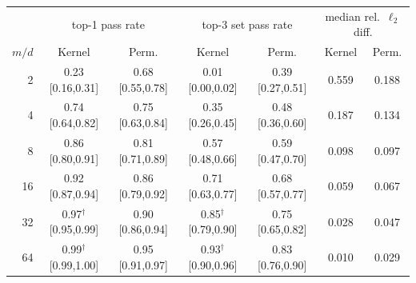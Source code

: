 \begin{tabular}{r|cc|cc|cc}
\toprule
& \multicolumn{2}{c|}{top-1 pass rate} & \multicolumn{2}{c|}{top-3 set pass rate} & \multicolumn{2}{c}{median rel.\ $\ell_2$ diff.}\\
$m/d$ & Kernel & Perm. & Kernel & Perm. & Kernel & Perm.\\
\midrule
2 & 0.23 [0.16,0.31] & 0.68 [0.55,0.78] & 0.01 [0.00,0.02] & 0.39 [0.27,0.51] & 0.559 & 0.188\\
4 & 0.74 [0.64,0.82] & 0.75 [0.63,0.84] & 0.35 [0.26,0.45] & 0.48 [0.36,0.60] & 0.187 & 0.134\\
8 & 0.86 [0.80,0.91] & 0.81 [0.71,0.89] & 0.57 [0.48,0.66] & 0.59 [0.47,0.70] & 0.098 & 0.097\\
16 & 0.92 [0.87,0.94] & 0.86 [0.79,0.92] & 0.71 [0.63,0.77] & 0.68 [0.57,0.77] & 0.059 & 0.067\\
32 & 0.97$^\dagger$ [0.95,0.99] & 0.90 [0.86,0.94] & 0.85$^\dagger$ [0.79,0.90] & 0.75 [0.65,0.82] & 0.028 & 0.047\\
64 & 0.99$^\dagger$ [0.99,1.00] & 0.95 [0.91,0.97] & 0.93$^\dagger$ [0.90,0.96] & 0.83 [0.76,0.90] & 0.010 & 0.029\\
\bottomrule
\end{tabular}
